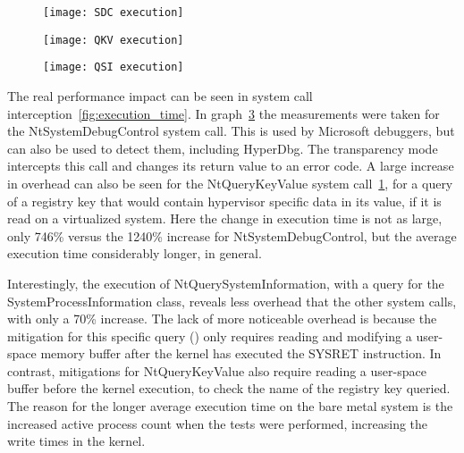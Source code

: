 \begin{figure*}[th]
    \begin{subfigure}[t]{\threecolgrid}
        \texttt{[image: SDC execution]}
        \sfigcap{}\label{fig:exec-time-a}
    \end{subfigure}
    \begin{subfigure}[t]{\threecolgrid}
        \texttt{[image: QKV execution]}
        \sfigcap{}\label{fig:exec-time-b}
    \end{subfigure}
    \begin{subfigure}[t]{\threecolgrid}
        \texttt{[image: QSI execution]}
        \sfigcap{}\label{fig:exec-time-c}
    \end{subfigure}
    \label{fig:execution_time}
\end{figure*}

The real performance impact can be seen in system call interception~\ref{fig:execution_time}. In graph~\ref{fig:exec-time-c} 
the measurements were taken for the NtSystemDebugControl system call. 
This is used by Microsoft debuggers, but can also be used to detect them, including HyperDbg. The transparency mode intercepts this call 
and changes its return value to an error code. A large increase in overhead can also be seen for the NtQueryKeyValue system call~\ref{fig:exec-time-a}, 
for a query of a registry key that would contain hypervisor specific data in its value, if it is read on a virtualized system.
Here the change in execution time is not as large, only 746\% versus the 1240\% increase for NtSystemDebugControl, but the average execution time considerably longer, in general.

Interestingly, the execution of NtQuerySystemInformation, with a query for the SystemProcessInformation class, reveals less overhead that the other system calls, 
with only a 70\% increase. The lack of more noticeable overhead is because the mitigation for this specific query () 
only requires reading and modifying a user-space memory buffer after the kernel has executed the SYSRET instruction. In contrast, mitigations for NtQueryKeyValue 
also require reading a user-space buffer before the kernel execution, to check the name of the registry key queried. 
The reason for the longer average execution time on the bare metal system is the increased active process count when the tests were performed, increasing the write times in the kernel.

